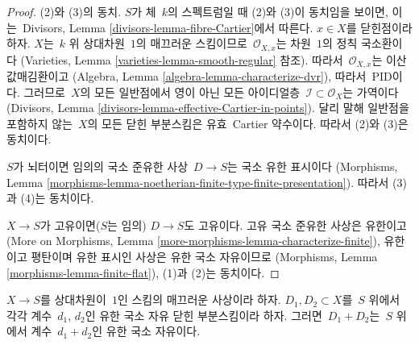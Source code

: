 \begin{proof}
(2)와 (3)의 동치. $S$가 체\  $k$의 스펙트럼일 때 (2)와 (3)이
동치임을 보이면, 이는\  Divisors, Lemma
\ref{divisors-lemma-fibre-Cartier}에서 따른다. $x \in X$를 닫힌점이라 하자.
$X$는\  $k$ 위 상대차원\  $1$의 매끄러운 스킴이므로\ 
$\mathcal{O}_{X, x}$는 차원\  $1$의 정칙 국소환이다
(Varieties, Lemma \ref{varieties-lemma-smooth-regular} 참조).
따라서\  $\mathcal{O}_{X, x}$는 이산 값매김환이고
(Algebra, Lemma \ref{algebra-lemma-characterize-dvr}), 따라서\  PID이다.
그러므로\  $X$의 모든 일반점에서 영이 아닌 모든 아이디얼층\ 
$\mathcal{I} \subset \mathcal{O}_X$는 가역이다
(Divisors, Lemma \ref{divisors-lemma-effective-Cartier-in-points}).
달리 말해 일반점을 포함하지 않는\  $X$의 모든 닫힌 부분스킴은 유효\ 
Cartier 약수이다. 따라서 (2)와 (3)은 동치이다.

\medskip\noindent
$S$가 뇌터이면 임의의 국소 준유한 사상\  $D \to S$는 국소 유한 표시이다
(Morphisms, Lemma
\ref{morphisms-lemma-noetherian-finite-type-finite-presentation}).
따라서 (3)과 (4)는 동치이다.

\medskip\noindent
$X \to S$가 고유이면($S$는 임의) $D \to S$도 고유이다.
고유 국소 준유한 사상은 유한이고
(More on Morphisms, Lemma \ref{more-morphisms-lemma-characterize-finite}),
유한이고 평탄이며 유한 표시인 사상은 유한 국소 자유이므로
(Morphisms, Lemma \ref{morphisms-lemma-finite-flat}),
(1)과 (2)는 동치이다.
\end{proof}

\begin{lemma}
\label{lemma-sum-divisors-on-curves}
$X \to S$를 상대차원이\  $1$인 스킴의 매끄러운 사상이라 하자.
$D_1, D_2 \subset X$를\  $S$ 위에서 각각 계수\  $d_1$, $d_2$인 유한 국소
자유 닫힌 부분스킴이라 하자. 그러면\  $D_1 + D_2$는\  $S$ 위에서 계수\ 
$d_1 + d_2$인 유한 국소 자유이다.
\end{lemma}

